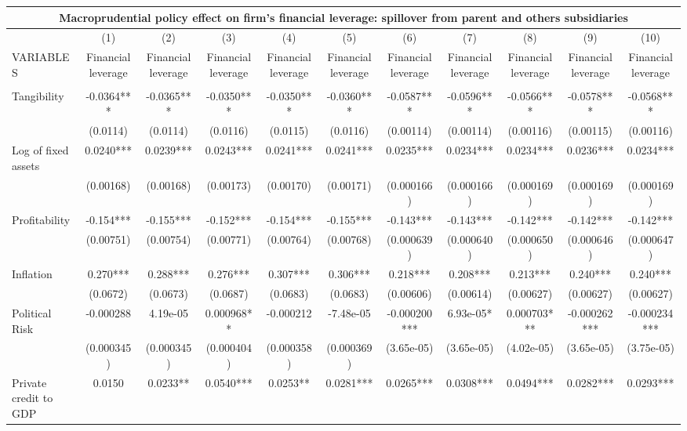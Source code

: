 \begin{tabular}{lcccccccccc}
\multicolumn{11}{c}{Macroprudential policy effect on firm's financial leverage: spillover from parent and others subsidiaries} \\ \hline
 & (1) & (2) & (3) & (4) & (5) & (6) & (7) & (8) & (9) & (10) \\
VARIABLES & Financial leverage & Financial leverage & Financial leverage & Financial leverage & Financial leverage & Financial leverage & Financial leverage & Financial leverage & Financial leverage & Financial leverage \\ \hline
 &  &  &  &  &  &  &  &  &  &  \\
Tangibility & -0.0364*** & -0.0365*** & -0.0350*** & -0.0350*** & -0.0360*** & -0.0587*** & -0.0596*** & -0.0566*** & -0.0578*** & -0.0568*** \\
 & (0.0114) & (0.0114) & (0.0116) & (0.0115) & (0.0116) & (0.00114) & (0.00114) & (0.00116) & (0.00115) & (0.00116) \\
Log of fixed assets & 0.0240*** & 0.0239*** & 0.0243*** & 0.0241*** & 0.0241*** & 0.0235*** & 0.0234*** & 0.0234*** & 0.0236*** & 0.0234*** \\
 & (0.00168) & (0.00168) & (0.00173) & (0.00170) & (0.00171) & (0.000166) & (0.000166) & (0.000169) & (0.000169) & (0.000169) \\
Profitability & -0.154*** & -0.155*** & -0.152*** & -0.154*** & -0.155*** & -0.143*** & -0.143*** & -0.142*** & -0.142*** & -0.142*** \\
 & (0.00751) & (0.00754) & (0.00771) & (0.00764) & (0.00768) & (0.000639) & (0.000640) & (0.000650) & (0.000646) & (0.000647) \\
Inflation & 0.270*** & 0.288*** & 0.276*** & 0.307*** & 0.306*** & 0.218*** & 0.208*** & 0.213*** & 0.240*** & 0.240*** \\
 & (0.0672) & (0.0673) & (0.0687) & (0.0683) & (0.0683) & (0.00606) & (0.00614) & (0.00627) & (0.00627) & (0.00627) \\
Political Risk & -0.000288 & 4.19e-05 & 0.000968** & -0.000212 & -7.48e-05 & -0.000200*** & 6.93e-05* & 0.000703*** & -0.000262*** & -0.000234*** \\
 & (0.000345) & (0.000345) & (0.000404) & (0.000358) & (0.000369) & (3.65e-05) & (3.65e-05) & (4.02e-05) & (3.65e-05) & (3.75e-05) \\
Private credit to GDP & 0.0150 & 0.0233** & 0.0540*** & 0.0253** & 0.0281*** & 0.0265*** & 0.0308*** & 0.0494*** & 0.0282*** & 0.0293*** \\

\end{tabular}
